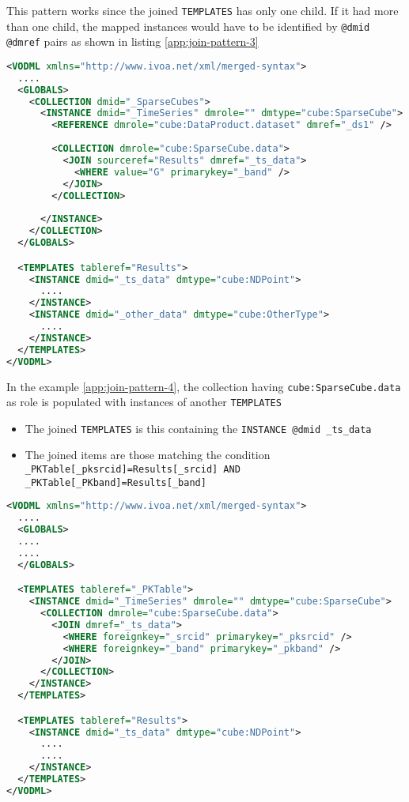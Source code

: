 This pattern works since the joined \texttt{TEMPLATES} has only one child. 
If it had more than one child, the mapped instances would have to be identified by \texttt{@dmid} \texttt{@dmref} pairs as shown in listing \ref{app:join-pattern-3}

\begin{lstlisting}[label={app:join-pattern-3},caption={Joining a \texttt{TEMPLATES} with a global \texttt{COLLECTION} identified by both \texttt{@sourceref} and \texttt{(@dmid,@dmref)} pairs.},language=XML]
<VODML xmlns="http://www.ivoa.net/xml/merged-syntax">
  ....
  <GLOBALS>
    <COLLECTION dmid="_SparseCubes">
      <INSTANCE dmid="_TimeSeries" dmrole="" dmtype="cube:SparseCube">
        <REFERENCE dmrole="cube:DataProduct.dataset" dmref="_ds1" />
        
        <COLLECTION dmrole="cube:SparseCube.data">
          <JOIN sourceref="Results" dmref="_ts_data">
            <WHERE value="G" primarykey="_band" />
          </JOIN>
        </COLLECTION>
        
      </INSTANCE>
    </COLLECTION>
  </GLOBALS>

  <TEMPLATES tableref="Results">
    <INSTANCE dmid="_ts_data" dmtype="cube:NDPoint">
      ....
    </INSTANCE>
    <INSTANCE dmid="_other_data" dmtype="cube:OtherType">
      ....
    </INSTANCE>
  </TEMPLATES>
</VODML>
\end{lstlisting}  

In the example \ref{app:join-pattern-4}, the collection having \texttt{cube:SparseCube.data} as role is populated with  instances of another \texttt{TEMPLATES}
\begin{itemize}
  \item The joined \texttt{TEMPLATES} is this containing the  \texttt{INSTANCE \texttt{@dmid} \_ts\_data}
  \item The joined items are those matching the condition  \texttt{\_PKTable[\_pksrcid]=Results[\_srcid] AND  \_PKTable[\_PKband]=Results[\_band]}
\end{itemize}


\begin{lstlisting}[label={app:join-pattern-4},caption={Joining two \texttt{TEMPLATES} together with \texttt{(@dmid,@dmref)} pairs.},language=XML]
<VODML xmlns="http://www.ivoa.net/xml/merged-syntax">
  ....
  <GLOBALS>
  ....
  ....
  </GLOBALS>

  <TEMPLATES tableref="_PKTable">
    <INSTANCE dmid="_TimeSeries" dmrole="" dmtype="cube:SparseCube">
      <COLLECTION dmrole="cube:SparseCube.data">
        <JOIN dmref="_ts_data">
          <WHERE foreignkey="_srcid" primarykey="_pksrcid" />
          <WHERE foreignkey="_band" primarykey="_pkband" />
        </JOIN>
      </COLLECTION>
    </INSTANCE>
  </TEMPLATES>

  <TEMPLATES tableref="Results">
    <INSTANCE dmid="_ts_data" dmtype="cube:NDPoint">
      ....
      ....
    </INSTANCE>
  </TEMPLATES>
</VODML>
\end{lstlisting}  

